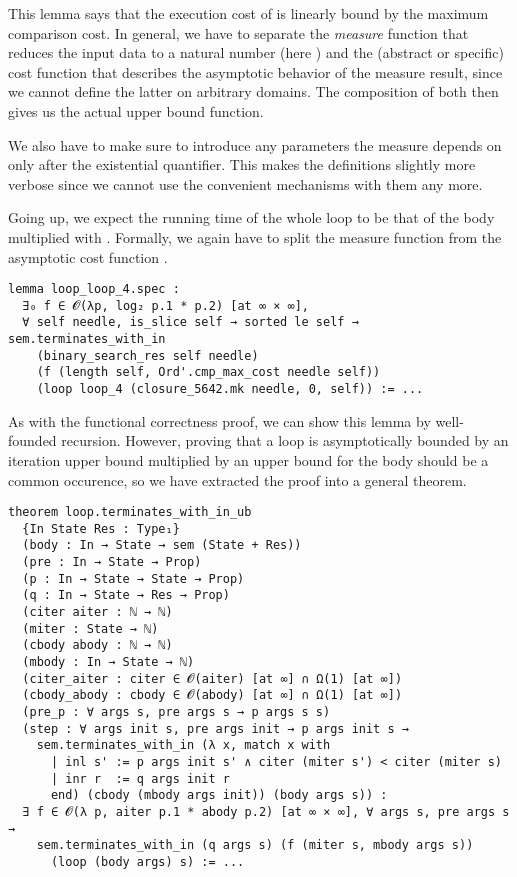This lemma says that the execution cost of  is linearly bound by
the maximum comparison cost. In general, we have to separate the \emph{measure}
function that reduces the input data to a natural number (here
) and the (abstract or specific) cost function that describes
the asymptotic behavior of the measure result, since we cannot define the latter
on arbitrary domains. The composition of both then gives us the actual upper
bound function.

We also have to make sure to introduce any parameters the
measure depends on only after the existential quantifier. This makes the
definitions slightly more verbose since we cannot use the convenient
 mechanisms with them any more.

Going up, we expect the running time of the whole loop to be that of the body
multiplied with . Formally, we again have to split the
measure function  from the asymptotic cost function .

\begin{verbatim}
lemma loop_loop_4.spec :
  ∃₀ f ∈ 𝓞(λp, log₂ p.1 * p.2) [at ∞ × ∞],
  ∀ self needle, is_slice self → sorted le self → sem.terminates_with_in
    (binary_search_res self needle)
    (f (length self, Ord'.cmp_max_cost needle self))
    (loop loop_4 (closure_5642.mk needle, 0, self)) := ...
\end{verbatim}

As with the functional correctness proof, we can show this lemma by well-founded
recursion. However, proving that a loop is asymptotically bounded by an
iteration upper bound multiplied by an upper bound for the body should be a
common occurence, so we have extracted the proof into a general theorem.

\begin{verbatim}
theorem loop.terminates_with_in_ub
  {In State Res : Type₁}
  (body : In → State → sem (State + Res))
  (pre : In → State → Prop)
  (p : In → State → State → Prop)
  (q : In → State → Res → Prop)
  (citer aiter : ℕ → ℕ)
  (miter : State → ℕ)
  (cbody abody : ℕ → ℕ)
  (mbody : In → State → ℕ)
  (citer_aiter : citer ∈ 𝓞(aiter) [at ∞] ∩ Ω(1) [at ∞])
  (cbody_abody : cbody ∈ 𝓞(abody) [at ∞] ∩ Ω(1) [at ∞])
  (pre_p : ∀ args s, pre args s → p args s s)
  (step : ∀ args init s, pre args init → p args init s →
    sem.terminates_with_in (λ x, match x with
      | inl s' := p args init s' ∧ citer (miter s') < citer (miter s)
      | inr r  := q args init r
      end) (cbody (mbody args init)) (body args s)) :
  ∃ f ∈ 𝓞(λ p, aiter p.1 * abody p.2) [at ∞ × ∞], ∀ args s, pre args s →
    sem.terminates_with_in (q args s) (f (miter s, mbody args s))
      (loop (body args) s) := ...
\end{verbatim}

